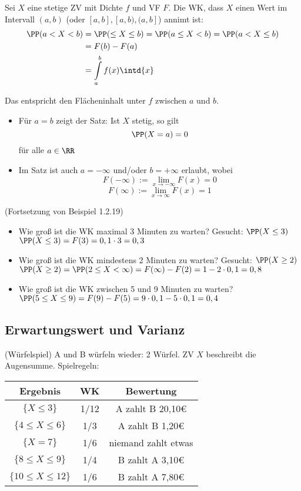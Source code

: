  Sei $X$ eine stetige ZV mit Dichte $f$ und VF $F$. Die WK, dass $X$ einen Wert im Intervall $(a,b)$ (oder $[a,b], [a,b), (a,b]$) annimt ist:
\begin{align*}
\PP(a < X<b) &= \PP(\leq X \leq b)
= \PP(a \leq X <b) 
= \PP(a < X \leq b)\\
&=F(b)-F(a) \\
&= \int\limits_a^b f(x) \intd{x}
\end{align*}

Das entspricht den Flächeninhalt unter $f$ zwischen $a$ und $b$.

\begin{itemize}
\item Für $a=b$ zeigt der Satz: Ist $X$ stetig, so gilt 
$$\PP(X=a) = 0$$
für alle $a \in \RR$
\item Im Satz ist auch $a = - \infty$ und/oder $b=+ \infty$ erlaubt, wobei 
$$F(-\infty) := \lim_{x \to -\infty} F(x) = 0$$
$$F(\infty) := \lim_{x \to \infty} F(x) = 1$$
\end{itemize}

 (Fortsetzung von Beispiel 1.2.19)
\begin{itemize}
\item Wie groß ist die WK maximal 3 Minuten zu warten? Gesucht: $\PP(X \leq 3)$\\
$\PP(X \leq 3) = F(3) = 0,1 \cdot 3 = 0,3$
\item Wie groß ist die WK mindestens 2 Minuten zu warten? Gesucht: $\PP(X \geq 2)$\\
$\PP(X \geq 2 ) = \PP(2 \leq X < \infty) = F(\infty)-F(2) = 1-2\cdot 0,1 = 0,8$
\item Wie groß ist die WK zwischen 5 und 9 Minuten zu warten?\\
$\PP( 5 \leq X \leq 9 ) = F(9) - F(5) = 9 \cdot 0,1 - 5 \cdot 0,1 = 0,4$
\end{itemize}

\subsection{Erwartungswert und Varianz}
 (Würfelspiel) A und B würfeln wieder: 2 Würfel. ZV $X$ beschreibt die Augensumme. Spielregeln:\\
\begin{tabular}{c | c | c}
Ergebnis & WK & Bewertung\\
\hline 
$\{X\leq 3\}$ & 1/12 & A zahlt B 20,10\euro{}\\
$\{4 \leq X \leq 6\}$ & 1/3 & A zahlt B 1,20\euro{}\\
$\{X=7\}$ & 1/6 & niemand zahlt etwas\\
$\{8 \leq X \leq 9\}$ & 1/4 & B zahlt A 3,10\euro{}\\
$\{ 10 \leq X \leq 12\}$ & 1/6 & B zahlt A 7,80\euro{}
\end{tabular}

